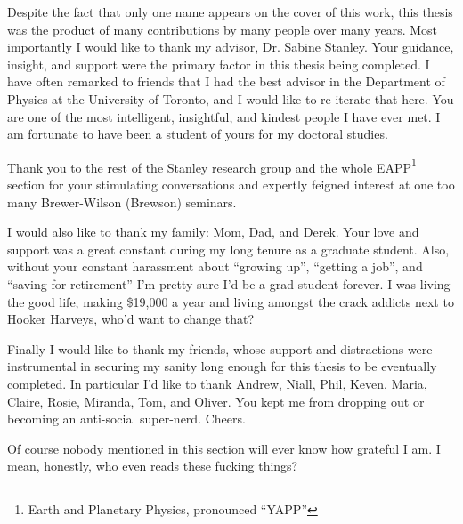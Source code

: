 
\begin{acknowledgements}
Despite the fact that only one name appears on the cover of this work, this thesis was the product of many contributions by many people over many years. Most importantly I would like to thank my advisor, Dr. Sabine Stanley. Your guidance, insight, and support were the primary factor in this thesis being completed. I have often remarked to friends that I had the best advisor in the Department of Physics at the University of Toronto, and I would like to re-iterate that here. You are one of the most intelligent, insightful, and kindest people I have ever met. I am fortunate to have been a student of yours for my doctoral studies.

Thank you to the rest of the Stanley research group and the whole EAPP\footnote{Earth and Planetary Physics, pronounced ``YAPP''} section for your stimulating conversations and expertly feigned interest at one too many Brewer-Wilson (Brewson) seminars.

I would also like to thank my family: Mom, Dad, and Derek. Your love and support was a great constant during my long tenure as a graduate student. Also, without your constant harassment about ``growing up'', ``getting a job'', and ``saving for retirement'' I'm pretty sure I'd be a grad student forever. I was living the good life, making \$19,000 a year and living amongst the crack addicts next to Hooker Harveys, who'd want to change that?

Finally I would like to thank my friends, whose support and distractions were instrumental in securing my sanity long enough for this thesis to be eventually completed. In particular I'd like to thank Andrew, Niall, Phil, Keven, Maria, Claire, Rosie, Miranda, Tom, and Oliver. You kept me from dropping out or becoming an anti-social super-nerd. Cheers.

Of course nobody mentioned in this section will ever know how grateful I am. I mean, honestly, who even reads these fucking things?

\end{acknowledgements}